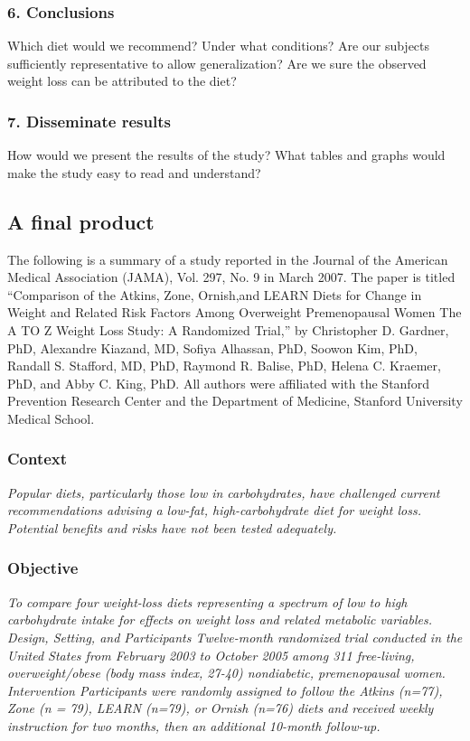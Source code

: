 \documentclass[11pt, chapterprefix=true]{scrbook}\usepackage[]{graphicx}\usepackage[]{color}
\begin{document}
\subsubsection{6.	Conclusions}

Which diet would we recommend?  Under what conditions? Are our subjects sufficiently representative to allow generalization?  Are we sure the observed weight loss can be attributed to the diet?

\subsubsection{7.	Disseminate results}

How would we present the results of the study?  What tables and graphs would make the study easy to read and understand?

\subsection{A final product}

The following is a summary of a study reported in the Journal of the American Medical Association (JAMA), Vol. 297, No. 9 in March 2007.  The paper is titled ``Comparison of the Atkins, Zone, Ornish,and LEARN Diets for Change in Weight and Related Risk Factors Among Overweight Premenopausal Women The A TO Z Weight Loss Study: A Randomized Trial,'' by Christopher D. Gardner, PhD, Alexandre Kiazand, MD, Sofiya Alhassan, PhD, Soowon Kim, PhD, Randall S. Stafford, MD, PhD, Raymond R. Balise, PhD, Helena C. Kraemer, PhD, and Abby C. King, PhD.  All authors were affiliated with the Stanford Prevention Research Center and the Department of Medicine, Stanford University Medical School.

\subsubsection{Context}

\textit{Popular diets, particularly those low in carbohydrates, have challenged current recommendations advising a low-fat, high-carbohydrate diet for weight loss. Potential benefits and risks have not been tested adequately.}

\subsubsection{Objective}

\textit{To compare four weight-loss diets representing a spectrum of low to high carbohydrate intake for effects on weight loss and related metabolic variables.  Design, Setting, and Participants Twelve-month randomized trial conducted in the United States from February 2003 to October 2005 among 311 free-living, overweight/obese (body mass index, 27-40) nondiabetic, premenopausal women.  Intervention Participants were randomly assigned to follow the Atkins (n=77), Zone (n = 79), LEARN (n=79), or Ornish (n=76) diets and received weekly instruction for two months, then an additional 10-month follow-up.}
\end{document}
